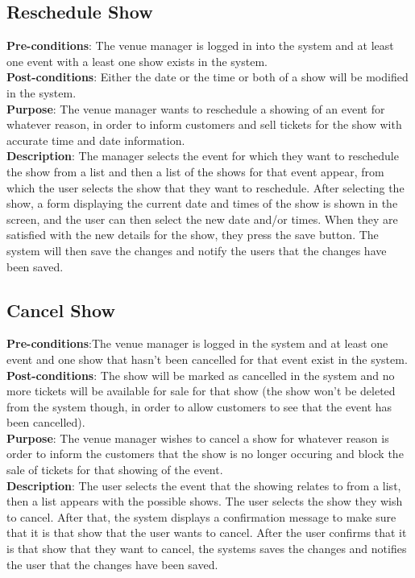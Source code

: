 \subsection{Reschedule Show}
\textbf{Pre-conditions}: The venue manager is logged in into the system
and at least one event with a least one show exists in the system.\\

\textbf{Post-conditions}: Either the date or the time or both of a show
will be modified in the system.\\

\textbf{Purpose}: The venue manager wants to reschedule a showing of
an event for whatever reason, in order to inform customers and sell
tickets for the show with accurate time and date information.\\

\textbf{Description}: The manager selects the event for which they want
to reschedule the show from a list and then a list of the shows for that
event appear, from which the user selects the show that they want to
reschedule. After selecting the show, a form displaying the current date
and times of the show is shown in the screen, and the user can then select the
new date and/or times. When they are satisfied with the new details for
the show, they press the save button. The system will then save the changes
and notify the users that the changes have been saved.

\subsection{Cancel Show}
\textbf{Pre-conditions}:The venue manager is logged in the system and at
least one event and one show that hasn't been cancelled for that event
exist in the system.\\

\textbf{Post-conditions}: The show will be marked as cancelled in the system
and no more tickets will be available for sale for that show (the show
won't be deleted from the system though, in order to allow customers
to see that the event has been cancelled).\\

\textbf{Purpose}: The venue manager wishes to cancel a show for whatever
reason is order to inform the customers that the show is no longer
occuring and block the sale of tickets for that showing of the event.\\

\textbf{Description}: The user selects the event that the showing
relates to from a list, then a list appears with the possible shows.
The user selects the show they wish to cancel. After that, the system
displays a confirmation message to make sure that it is that show that
the user wants to cancel. After the user confirms that it is that show
that they want to cancel, the systems saves the changes and notifies
the user that the changes have been saved.


